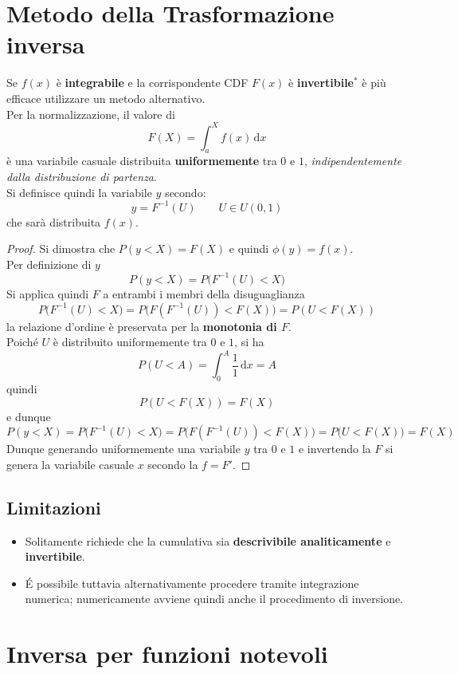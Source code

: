 \documentclass[10pt, oneside]{book}
\newcommand{\integral}[4]{\int_{#1}^{#2} #3 \, \mathrm{d}#4}
\begin{document}
\section{Metodo della Trasformazione inversa}
Se $f(x)$ è \textbf{integrabile} e la corrispondente CDF $F(x)$ è \textbf{invertibile}$^\ast$ è più efficace utilizzare un metodo alternativo.\\
Per la normalizzazione, il valore di 
\[F(X) = \integral{a}{X}{f(x)}{x}\]
è una variabile casuale distribuita \textbf{uniformemente} tra $0$ e $1$, \textit{indipendentemente dalla distribuzione di partenza}.\\
Si definisce quindi la variabile $y$ secondo:
\[y = F^{-1}(U) \qquad U \in U(0,1)\]
che sarà distribuita $f(x)$.
\begin{proof}
Si dimostra che $P( y < X) = F(X)$ e quindi $\phi(y) = f(x)$. \\
Per definizione di $y$
\[P(y < X) = P\big(F^{-1}(U) < X \big)\]
Si applica quindi $F$ a entrambi i membri della disuguaglianza
\[P\big(F^{-1}(U) < X \big) = P\big(F(F^{-1}(U)) < F(X) \big) = P(U < F(X)) \]
la relazione d'ordine è preservata per la \textbf{monotonia di $F$}.\\
Poiché $U$ è distribuito uniformemente tra $0$ e $1$, si ha
\[P(U < A) = \integral{0}{A}{\frac{1}{1}}{x} = A\]
quindi
\[P(U < F(X)) = F(X)\]
e dunque
\[P(y < X) = P\big(F^{-1}(U) < X \big) = P\big(F(F^{-1}(U)) < F(X) \big) = P\big(U < F(X) \big) = F(X)\]
Dunque generando uniformemente una variabile $y$ tra $0$ e $1$ e invertendo la $F$ si genera la variabile casuale $x$ secondo la $f = F'$.
\end{proof}

\subsection*{Limitazioni}
\begin{itemize}
\item Solitamente richiede che la cumulativa sia \textbf{descrivibile analiticamente} e \textbf{invertibile}.
\item \'E possibile tuttavia alternativamente procedere tramite integrazione numerica; numericamente avviene quindi anche il procedimento di inversione.
\end{itemize}

\section{Inversa per funzioni notevoli}
\end{document}
